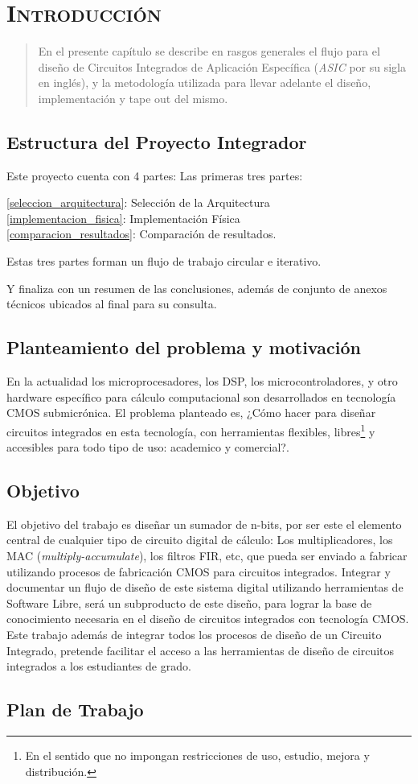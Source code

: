 \chapter{ \textsc{ Introducción } }
\begin{abstract}
En el presente capítulo se describe en rasgos generales el flujo para el diseño de Circuitos Integrados de Aplicación Específica (\emph{ASIC} por su sigla en inglés), y la metodología utilizada para llevar adelante el diseño, implementación y tape out del mismo.
\end{abstract}
\section{Estructura del Proyecto Integrador}

Este proyecto cuenta con 4 partes: Las primeras tres partes:
 
\ref{seleccion_arquitectura}: Selección de la Arquitectura \\
\ref{implementacion_fisica}: Implementación Física \\
\ref{comparacion_resultados}: Comparación de resultados. 

Estas tres partes forman un flujo de trabajo circular e iterativo.

Y finaliza con un resumen de las conclusiones, además de conjunto de anexos técnicos ubicados al final para su consulta.


\section{Planteamiento del problema y motivación}
En la actualidad los microprocesadores, los DSP, los microcontroladores, y otro hardware específico para cálculo computacional son desarrollados en tecnología CMOS submicrónica. El problema planteado es, ¿Cómo hacer para diseñar circuitos integrados en esta tecnología, con herramientas flexibles, libres\footnote{En el sentido que no impongan restricciones de uso, estudio, mejora y distribución.} y accesibles para todo tipo de uso: academico y comercial?.

\section{Objetivo}

El objetivo del trabajo es diseñar un sumador de n-bits, por ser este el elemento central de cualquier tipo de circuito digital de cálculo: Los multiplicadores, los MAC (\emph{multiply-accumulate}), los filtros FIR, etc, que pueda ser enviado a fabricar utilizando
procesos de fabricación CMOS para circuitos integrados. Integrar y documentar un flujo de diseño
de este sistema digital utilizando herramientas de Software Libre, será un subproducto de este
diseño, para lograr la base de conocimiento necesaria en el diseño de circuitos integrados con
tecnología CMOS. Este trabajo además de integrar todos los procesos de diseño de un Circuito
Integrado, pretende facilitar el acceso a las herramientas de diseño de circuitos integrados a los estudiantes de grado.
\section{Plan de Trabajo}

